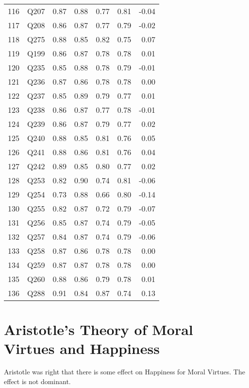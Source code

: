 \documentclass{amsart}
\begin{document}
\begin{longtable}{rlrrrrr}
  116 & Q207 & 0.87 & 0.88 & 0.77 & 0.81 & -0.04 \\ 
  117 & Q208 & 0.86 & 0.87 & 0.77 & 0.79 & -0.02 \\ 
  118 & Q275 & 0.88 & 0.85 & 0.82 & 0.75 & 0.07 \\ 
  119 & Q199 & 0.86 & 0.87 & 0.78 & 0.78 & 0.01 \\ 
  120 & Q235 & 0.85 & 0.88 & 0.78 & 0.79 & -0.01 \\ 
  121 & Q236 & 0.87 & 0.86 & 0.78 & 0.78 & 0.00 \\ 
  122 & Q237 & 0.85 & 0.89 & 0.79 & 0.77 & 0.01 \\ 
  123 & Q238 & 0.86 & 0.87 & 0.77 & 0.78 & -0.01 \\ 
  124 & Q239 & 0.86 & 0.87 & 0.79 & 0.77 & 0.02 \\ 
  125 & Q240 & 0.88 & 0.85 & 0.81 & 0.76 & 0.05 \\ 
  126 & Q241 & 0.88 & 0.86 & 0.81 & 0.76 & 0.04 \\ 
  127 & Q242 & 0.89 & 0.85 & 0.80 & 0.77 & 0.02 \\ 
  128 & Q253 & 0.82 & 0.90 & 0.74 & 0.81 & -0.06 \\ 
  129 & Q254 & 0.73 & 0.88 & 0.66 & 0.80 & -0.14 \\ 
  130 & Q255 & 0.82 & 0.87 & 0.72 & 0.79 & -0.07 \\ 
  131 & Q256 & 0.85 & 0.87 & 0.74 & 0.79 & -0.05 \\ 
  132 & Q257 & 0.84 & 0.87 & 0.74 & 0.79 & -0.06 \\ 
  133 & Q258 & 0.87 & 0.86 & 0.78 & 0.78 & 0.00 \\ 
  134 & Q259 & 0.87 & 0.87 & 0.78 & 0.78 & 0.00 \\ 
  135 & Q260 & 0.88 & 0.86 & 0.79 & 0.78 & 0.01 \\ 
  136 & Q288 & 0.91 & 0.84 & 0.87 & 0.74 & 0.13 \\ 
   \hline
\hline
\end{longtable}


\section{Aristotle's Theory of Moral Virtues and Happiness}

Aristotle was right that there is some effect on Happiness for Moral Virtues.  The effect is not dominant.
\end{document}
